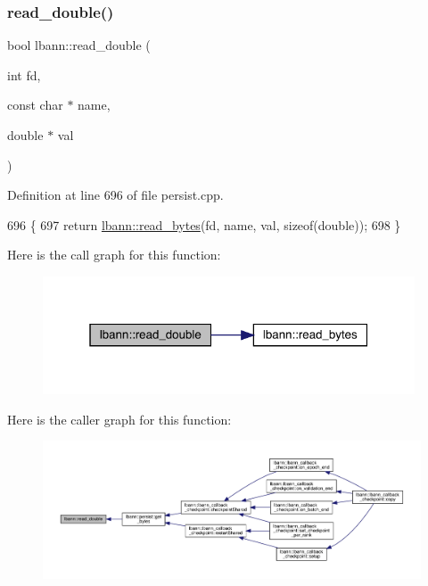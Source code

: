 \subsubsection{\texorpdfstring{read\+\_\+double()}{read\_double()}}
{\footnotesize\ttfamily bool lbann\+::read\+\_\+double (\begin{DoxyParamCaption}\item[{int}]{fd,  }\item[{const char $\ast$}]{name,  }\item[{double $\ast$}]{val }\end{DoxyParamCaption})}



Definition at line 696 of file persist.\+cpp.


\begin{DoxyCode}
696                                                              \{
697   \textcolor{keywordflow}{return} \hyperlink{namespacelbann_a85385e2a9e058b6720300b4cbdd2b1d0}{lbann::read\_bytes}(fd, name, val, \textcolor{keyword}{sizeof}(\textcolor{keywordtype}{double}));
698 \}
\end{DoxyCode}
Here is the call graph for this function\+:\nopagebreak
\begin{figure}[H]
\begin{center}
\leavevmode
\includegraphics[width=313pt]{namespacelbann_a66f98f36cf54dca622f1186309961dd4_cgraph}
\end{center}
\end{figure}
Here is the caller graph for this function\+:\nopagebreak
\begin{figure}[H]
\begin{center}
\leavevmode
\includegraphics[width=350pt]{namespacelbann_a66f98f36cf54dca622f1186309961dd4_icgraph}
\end{center}
\end{figure}
\mbox{\label{namespacelbann_acd0595f8c31773a3a46f477a83e4c0f3}} 
